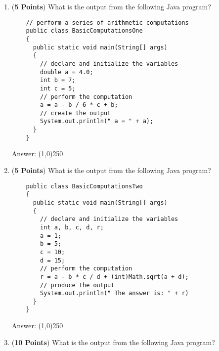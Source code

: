 \documentclass[12pt]{article}
\begin{document}
\begin{enumerate}

  \item ({\bf 5 Points}) What is the output from the following Java program?

\hspace*{.25in}
\begin{minipage}{6in}
  \lstset{numbers=left}
  \begin{lstlisting}
    // perform a series of arithmetic computations
    public class BasicComputationsOne
    {
      public static void main(String[] args)
      {
        // declare and initialize the variables
        double a = 4.0;
        int b = 7;
        int c = 5;
        // perform the computation
        a = a - b / 6 * c + b;
        // create the output
        System.out.println(" a = " + a);
      }
    }
  \end{lstlisting}

\end{minipage}

Answer: \line(1,0){250}

\newpage

\item ({\bf 5 Points}) What is the output from the following Java program?

\hspace*{.25in}
\begin{minipage}{6in}
  \lstset{numbers=left}
  \begin{lstlisting}
    public class BasicComputationsTwo
    {
      public static void main(String[] args)
      {
        // declare and initialize the variables
        int a, b, c, d, r;
        a = 1;
        b = 5;
        c = 10;
        d = 15;
        // perform the computation
        r = a - b * c / d + (int)Math.sqrt(a + d);
        // produce the output
        System.out.println(" The answer is: " + r)
      }
    }
  \end{lstlisting}

\end{minipage}

Answer: \line(1,0){250}

\newpage

\item ({\bf 10 Points}) What is the output from the following Java program?


\end{enumerate}
\end{document}
